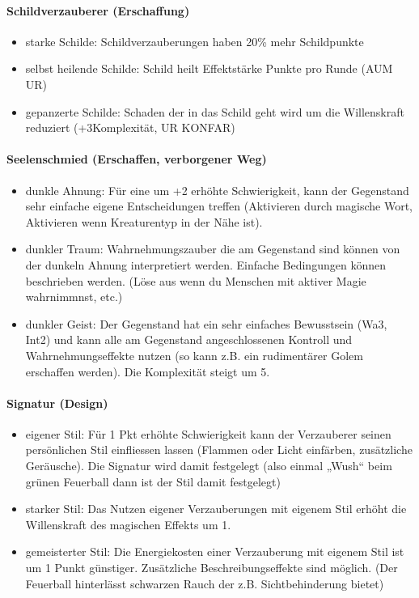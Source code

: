 \documentclass{article}
\begin{document}
\paragraph{Schildverzauberer (Erschaffung)}

\begin{itemize}
\item starke Schilde: Schildverzauberungen haben 20\% mehr Schildpunkte
\item selbst heilende Schilde: Schild heilt Effektstärke Punkte pro Runde (AUM UR)
\item gepanzerte Schilde: Schaden der in das Schild geht wird um die Willenskraft reduziert (+3Komplexität, UR KONFAR)
\end{itemize}

\paragraph{Seelenschmied (Erschaffen, verborgener Weg)}

\begin{itemize}
\item dunkle Ahnung: Für eine um +2 erhöhte Schwierigkeit, kann der Gegenstand sehr einfache eigene Entscheidungen treffen (Aktivieren durch magische Wort, Aktivieren wenn Kreaturentyp in der Nähe ist).
\item dunkler Traum: Wahrnehmungszauber die am Gegenstand sind können von der dunkeln Ahnung interpretiert werden. Einfache Bedingungen können beschrieben werden. (Löse aus wenn du Menschen mit aktiver Magie wahrnimmnst, etc.)
\item dunkler Geist: Der Gegenstand hat ein sehr einfaches Bewusstsein (Wa3, Int2) und kann alle am Gegenstand angeschlossenen Kontroll und Wahrnehmungseffekte nutzen (so kann z.B. ein rudimentärer Golem erschaffen werden). Die Komplexität steigt um 5.
\end{itemize}

\paragraph{Signatur (Design)}

\begin{itemize}
\item eigener Stil: Für 1 Pkt erhöhte Schwierigkeit kann der Verzauberer seinen persönlichen Stil einfliessen lassen (Flammen oder Licht einfärben, zusätzliche Geräusche). Die Signatur wird damit festgelegt (also einmal „Wush“ beim grünen Feuerball dann ist der Stil damit festgelegt)
\item starker Stil: Das Nutzen eigener Verzauberungen mit eigenem Stil erhöht die Willenskraft des magischen Effekts um 1.
\item gemeisterter Stil: Die Energiekosten einer Verzauberung mit eigenem Stil ist um 1 Punkt günstiger. Zusätzliche Beschreibungseffekte sind möglich. (Der Feuerball hinterlässt schwarzen Rauch der z.B. Sichtbehinderung bietet)
\end{itemize}
\end{document}
